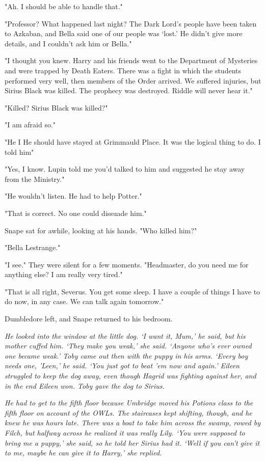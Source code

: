 "Ah. I should be able to handle that."

"Professor? What happened last night? The Dark Lord's people have been taken to Azkaban, and Bella said one of{\el} our people was `lost.' He didn't give more details, and I couldn't ask him or Bella."

"I thought you knew. Harry and his friends went to the Department of Mysteries and were trapped by Death Eaters. There was a fight in which the students performed very well, then members of the Order arrived. We suffered injuries, but{\el} Sirius Black was killed. The prophecy was destroyed. Riddle will never hear it."

"Killed? Sirius Black was killed?"

"I am afraid so."

"He{\el} I{\el} He should have stayed at Grimmauld Place. It was the logical thing to do. I told him{\el}"

"Yes, I know. Lupin told me you'd talked to him and suggested he stay away from the Ministry."

"He wouldn't listen. He had to help Potter."

"That is correct. No one could dissuade him."

Snape sat for awhile, looking at his hands. "Who killed him?"

"Bella Lestrange."

"I see." They were silent for a few moments. "Headmaster, do you need me for anything else? I am really very tired."

"That is all right, Severus. You get some sleep. I have a couple of things I have to do now, in any case. We can talk again tomorrow."

Dumbledore left, and Snape returned to his bedroom.

\sbreak

\emph{He looked into the window at the little dog. `I want it, Mum,' he said, but his mother cuffed him. `They make you weak,' she said. `Anyone who's ever owned one became weak.' Toby came out then with the puppy in his arms. `Every boy needs one, 'Leen,' he said. `You just got to beat 'em now and again.' Eileen struggled to keep the dog away, even though Hagrid was fighting against her, and in the end Eileen won. Toby gave the dog to Sirius.}

\emph{He had to get to the fifth floor because Umbridge moved his Potions class to the fifth floor on account of the OWLs. The staircases kept shifting, though, and he knew he was hours late. There was a boat to take him across the swamp, rowed by Filch, but halfway across he realized it was really Lily. `You were supposed to bring me a puppy,' she said, so he told her Sirius had it. `Well if you can't give it to me, maybe he can give it to Harry,' she replied.}

